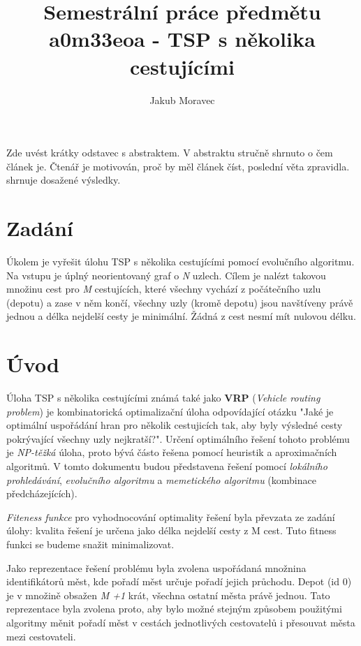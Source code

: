 \documentclass[journal]{IEEEtrancz}
\begin{document}
\title{Semestrální práce předmětu a0m33eoa - TSP s několika cestujícími}
\author{Jakub Moravec}

\maketitle

\begin{abstrakt}
Zde uvést krátky odstavec s abstraktem. V abstraktu stručně shrnuto o čem článek je.
Čtenář je motivován, proč by měl článek číst, poslední věta zpravidla.
shrnuje dosažené výsledky.
\end{abstrakt}

\IEEEpeerreviewmaketitle

\section{Zadání}
Úkolem je vyřešit úlohu TSP s několika cestujícími pomocí evolučního algoritmu. Na vstupu je úplný neorientovaný graf o \textit{N} uzlech. Cílem je nalézt takovou množinu cest pro \textit{M} cestujících, které všechny vychází z počátečního uzlu (depotu) a zase v něm končí, všechny uzly (kromě depotu) jsou navštíveny právě jednou a délka nejdelší cesty je minimální. Žádná z cest nesmí mít nulovou délku.

\section{Úvod}
Úloha TSP s několika cestujícími známá také jako \textbf{VRP} (\textit{Vehicle routing problem}) je kombinatorická optimalizační úloha odpovídající otázku "Jaké je optimální uspořádání hran pro několik cestujicích tak, aby byly výsledné cesty pokrývající všechny uzly nejkratší?". Určení optimálního řešení tohoto problému je \textit{NP-těžká} úloha, proto bývá částo řešena pomocí heuristik a aproximačních algoritmů. V tomto dokumentu budou představena řešení pomocí \textit{lokálního prohledávání}, \textit{evolučního algoritmu} a \textit{memetického algoritmu} (kombinace předcházejících). 

\textit{Fiteness funkce} pro vyhodnocování optimality řešení byla převzata ze zadání úlohy: kvalita řešení je určena jako délka nejdelší cesty z M cest. Tuto fitness funkci se budeme snažit minimalizovat.

Jako reprezentace řešení problému byla zvolena uspořádaná množnina identifikátorů měst, kde pořadí měst určuje pořadí jejich průchodu. Depot (id 0) je v množině obsažen \textit{M +1} krát, všechna ostatní města právě jednou. Tato reprezentace byla zvolena proto, aby bylo možné stejným způsobem použitými algoritmy měnit pořadí měst v cestách jednotlivých cestovatelů i přesouvat města mezi cestovateli.  
\end{document}
